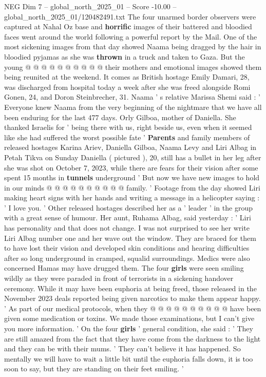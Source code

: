 \begin{textsample}{NEG Dim 7 – global\_north\_2025\_01 – Score -10.00 – global\_north\_2025\_01/120482491.txt}
The four unarmed border observers were captured at Nahal Oz base and \textbf{horrific} images of their battered and bloodied faces went around the world following a powerful report by the Mail.
One of the most sickening images from that day showed Naama being dragged by the hair in bloodied pyjamas as she was \textbf{thrown} in a truck and taken to Gaza.
But the young @ @ @ @ @ @ @ @ @ @ their mothers and emotional images showed them being reunited at the weekend.
It comes as British hostage Emily Damari, 28, was discharged from hospital today a week after she was freed alongside Romi Gonen, 24, and Doron Steinbrecher, 31.
Naama ' s relative Marissa Shemi said : ' Everyone knew Naama from the very beginning of the nightmare that we have all been enduring for the last 477 days.
Orly Gilboa, mother of Daniella.
She thanked Israelis for ' being there with us, right beside us, even when it seemed like she had suffered the worst possible fate ' \textbf{Parents} and family members of released hostages Karina Ariev, Daniella Gilboa, Naama Levy and Liri Albag in Petah Tikva on Sunday Daniella ( pictured ), 20, still has a bullet in her leg after she was shot on October 7, 2023, while there are fears for their vision after some spent 15 months in \textbf{tunnels} underground ' But now we have new images to hold in our minds @ @ @ @ @ @ @ @ @ @ family. ' Footage from the day showed Liri making heart signs with her hands and writing a message in a helicopter saying : ' I love you. ' Other released hostages described her as a ' leader ' in the group with a great sense of humour.
Her aunt, Ruhama Albag, said yesterday : ' Liri has personality and that does not change.
I was not surprised to see her write Liri Albag number one and her wave out the window.
They are braced for them to have lost their vision and developed skin conditions and hearing difficulties after so long underground in cramped, squalid surroundings.
Medics were also concerned Hamas may have drugged them.
The four \textbf{girls} were seen smiling wildly as they were paraded in front of terrorists in a sickening handover ceremony.
While it may have been euphoria at being freed, those released in the November 2023 deals reported being given narcotics to make them appear happy. ' As part of our medical protocols, when they @ @ @ @ @ @ @ @ @ @ have been given some medication or toxins.
We made those examinations, but I can't give you more information. ' On the four \textbf{girls} ' general condition, she said : ' They are still amazed from the fact that they have come from the darkness to the light and they can be with their mums. ' They can't believe it has happened.
So mentally we will have to wait a little bit until the euphoria falls down, it is too soon to say, but they are standing on their feet smiling. '

\end{textsample}
